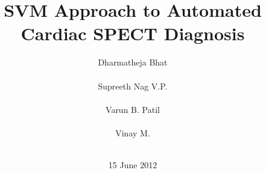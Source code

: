 \documentclass{acm_proc_article-sp}
\begin{document}
\title{SVM Approach to Automated Cardiac SPECT Diagnosis}
%
%
%
%
%

%
\author{
%
%
\alignauthor 
Dharmatheja Bhat\\
       \\
\alignauthor 
Supreeth Nag V.P.\\
       \\
\alignauthor
Varun B. Patil\\
       \\
\alignauthor
Vinay M.\\
       \\
}
\date{15 June 2012}
\end{document}
